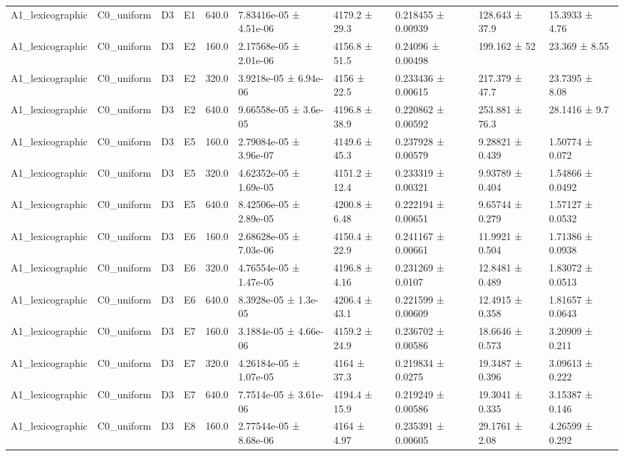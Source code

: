 \begin{table}
\begin{tabular}{llllllllll}
A1\_lexicographic & C0\_uniform & D3 & E1 & 640.0 & 7.83416e-05 ± 4.51e-06 & 4179.2 ± 29.3 & 0.218455 ± 0.00939 & 128.643 ± 37.9 & 15.3933 ± 4.76 \\
A1\_lexicographic & C0\_uniform & D3 & E2 & 160.0 & 2.17568e-05 ± 2.01e-06 & 4156.8 ± 51.5 & 0.24096 ± 0.00498 & 199.162 ± 52 & 23.369 ± 8.55 \\
A1\_lexicographic & C0\_uniform & D3 & E2 & 320.0 & 3.9218e-05 ± 6.94e-06 & 4156 ± 22.5 & 0.233436 ± 0.00615 & 217.379 ± 47.7 & 23.7395 ± 8.08 \\
A1\_lexicographic & C0\_uniform & D3 & E2 & 640.0 & 9.66558e-05 ± 3.6e-05 & 4196.8 ± 38.9 & 0.220862 ± 0.00592 & 253.881 ± 76.3 & 28.1416 ± 9.7 \\
A1\_lexicographic & C0\_uniform & D3 & E5 & 160.0 & 2.79084e-05 ± 3.96e-07 & 4149.6 ± 45.3 & 0.237928 ± 0.00579 & 9.28821 ± 0.439 & 1.50774 ± 0.072 \\
A1\_lexicographic & C0\_uniform & D3 & E5 & 320.0 & 4.62352e-05 ± 1.69e-05 & 4151.2 ± 12.4 & 0.233319 ± 0.00321 & 9.93789 ± 0.404 & 1.54866 ± 0.0492 \\
A1\_lexicographic & C0\_uniform & D3 & E5 & 640.0 & 8.42506e-05 ± 2.89e-05 & 4200.8 ± 6.48 & 0.222194 ± 0.00651 & 9.65744 ± 0.279 & 1.57127 ± 0.0532 \\
A1\_lexicographic & C0\_uniform & D3 & E6 & 160.0 & 2.68628e-05 ± 7.03e-06 & 4150.4 ± 22.9 & 0.241167 ± 0.00661 & 11.9921 ± 0.504 & 1.71386 ± 0.0938 \\
A1\_lexicographic & C0\_uniform & D3 & E6 & 320.0 & 4.76554e-05 ± 1.47e-05 & 4196.8 ± 4.16 & 0.231269 ± 0.0107 & 12.8481 ± 0.489 & 1.83072 ± 0.0513 \\
A1\_lexicographic & C0\_uniform & D3 & E6 & 640.0 & 8.3928e-05 ± 1.3e-05 & 4206.4 ± 43.1 & 0.221599 ± 0.00609 & 12.4915 ± 0.358 & 1.81657 ± 0.0643 \\
A1\_lexicographic & C0\_uniform & D3 & E7 & 160.0 & 3.1884e-05 ± 4.66e-06 & 4159.2 ± 24.9 & 0.236702 ± 0.00586 & 18.6646 ± 0.573 & 3.20909 ± 0.211 \\
A1\_lexicographic & C0\_uniform & D3 & E7 & 320.0 & 4.26184e-05 ± 1.07e-05 & 4164 ± 37.3 & 0.219834 ± 0.0275 & 19.3487 ± 0.396 & 3.09613 ± 0.222 \\
A1\_lexicographic & C0\_uniform & D3 & E7 & 640.0 & 7.7514e-05 ± 3.61e-06 & 4194.4 ± 15.9 & 0.219249 ± 0.00586 & 19.3041 ± 0.335 & 3.15387 ± 0.146 \\
A1\_lexicographic & C0\_uniform & D3 & E8 & 160.0 & 2.77544e-05 ± 8.68e-06 & 4164 ± 4.97 & 0.235391 ± 0.00605 & 29.1761 ± 2.08 & 4.26599 ± 0.292 \\

\end{tabular}
\end{table}
